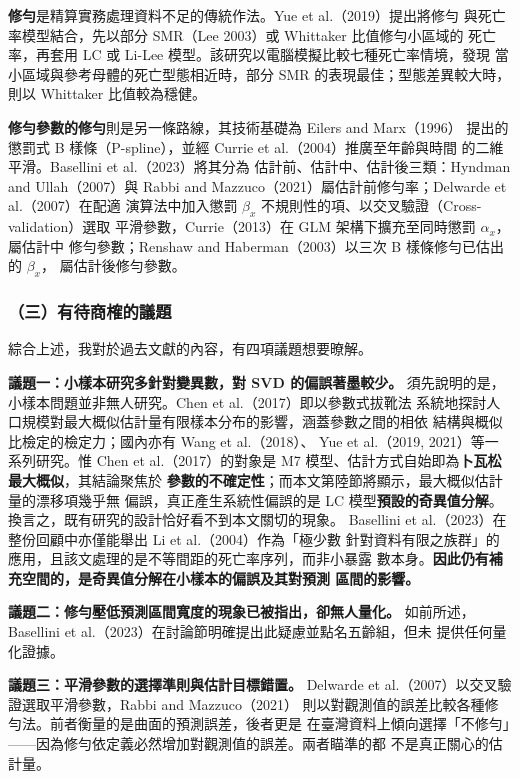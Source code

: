 \documentclass[UTF8, fontset=macnew, a4paper, 12pt]{ctexart}
\begin{document}
\textbf{修勻}是精算實務處理資料不足的傳統作法。Yue et al.（2019）提出將修勻
與死亡率模型結合，先以部分 SMR（Lee 2003）或 Whittaker 比值修勻小區域的
死亡率，再套用 LC 或 Li-Lee 模型。該研究以電腦模擬比較七種死亡率情境，發現
當小區域與參考母體的死亡型態相近時，部分 SMR 的表現最佳；型態差異較大時，
則以 Whittaker 比值較為穩健。

\textbf{修勻參數的修勻}則是另一條路線，其技術基礎為 Eilers and Marx（1996）
提出的懲罰式 B 樣條（P-spline），並經 Currie et al.（2004）推廣至年齡與時間
的二維平滑。Basellini et al.（2023）將其分為
估計前、估計中、估計後三類：Hyndman and Ullah（2007）與
Rabbi and Mazzuco（2021）屬估計前修勻率；Delwarde et al.（2007）在配適
演算法中加入懲罰 $\beta_x$ 不規則性的項、以交叉驗證（Cross-validation）選取
平滑參數，Currie（2013）在 GLM 架構下擴充至同時懲罰 $\alpha_x$，屬估計中
修勻參數；Renshaw and Haberman（2003）以三次 B 樣條修勻已估出的 $\beta_x$，
屬估計後修勻參數。

\subsubsection{（三）有待商榷的議題}

綜合上述，我對於過去文獻的內容，有四項議題想要暸解。

\textbf{議題一：小樣本研究多針對變異數，對 SVD 的偏誤著墨較少。}
須先說明的是，小樣本問題並非無人研究。Chen et al.（2017）即以參數式拔靴法
系統地探討人口規模對最大概似估計量有限樣本分布的影響，涵蓋參數之間的相依
結構與概似比檢定的檢定力；國內亦有 Wang et al.（2018）、
Yue et al.（2019, 2021）等一系列研究。惟 Chen et al.（2017）的對象是
M7 模型、估計方式自始即為\textbf{卜瓦松最大概似}，其結論聚焦於
\textbf{參數的不確定性}；而本文第陸節將顯示，最大概似估計量的漂移項幾乎無
偏誤，真正產生系統性偏誤的是 LC 模型\textbf{預設的奇異值分解}。
換言之，既有研究的設計恰好看不到本文關切的現象。
Basellini et al.（2023）在整份回顧中亦僅能舉出 Li et al.（2004）作為「極少數
針對資料有限之族群」的應用，且該文處理的是不等間距的死亡率序列，而非小暴露
數本身。\textbf{因此仍有補充空間的，是奇異值分解在小樣本的偏誤及其對預測
區間的影響。}

\textbf{議題二：修勻壓低預測區間寬度的現象已被指出，卻無人量化。}
如前所述，Basellini et al.（2023）在討論節明確提出此疑慮並點名五齡組，但未
提供任何量化證據。

\textbf{議題三：平滑參數的選擇準則與估計目標錯置。}
Delwarde et al.（2007）以交叉驗證選取平滑參數，Rabbi and Mazzuco（2021）
則以對觀測值的誤差比較各種修勻法。前者衡量的是曲面的預測誤差，後者更是
在臺灣資料上傾向選擇「不修勻」——因為修勻依定義必然增加對觀測值的誤差。兩者瞄準的都
不是真正關心的估計量。
\end{document}
